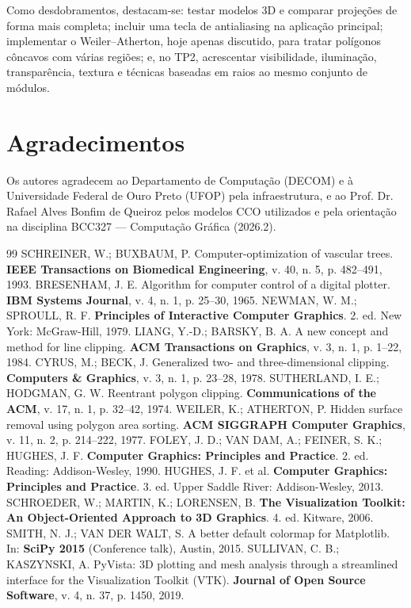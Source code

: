 \documentclass[11pt, a4paper]{article}
\begin{document}
Como desdobramentos, destacam-se: testar modelos 3D e comparar projeções de forma mais completa; incluir uma tecla de antialiasing na aplicação principal; implementar o Weiler--Atherton, hoje apenas discutido, para tratar polígonos côncavos com várias regiões; e, no TP2, acrescentar visibilidade, iluminação, transparência, textura e técnicas baseadas em raios ao mesmo conjunto de módulos.

\section*{Agradecimentos}
Os autores agradecem ao Departamento de Computação (DECOM) e à Universidade Federal de Ouro Preto (UFOP) pela infraestrutura, e ao Prof. Dr. Rafael Alves Bonfim de Queiroz pelos modelos CCO utilizados e pela orientação na disciplina BCC327 --- Computação Gráfica (2026.2).

\begin{thebibliography}{99}
   SCHREINER, W.; BUXBAUM, P. Computer-optimization of vascular trees. \textbf{IEEE Transactions on Biomedical Engineering}, v. 40, n. 5, p. 482--491, 1993.
   BRESENHAM, J. E. Algorithm for computer control of a digital plotter. \textbf{IBM Systems Journal}, v. 4, n. 1, p. 25--30, 1965.
   NEWMAN, W. M.; SPROULL, R. F. \textbf{Principles of Interactive Computer Graphics}. 2. ed. New York: McGraw-Hill, 1979.
   LIANG, Y.-D.; BARSKY, B. A. A new concept and method for line clipping. \textbf{ACM Transactions on Graphics}, v. 3, n. 1, p. 1--22, 1984.
   CYRUS, M.; BECK, J. Generalized two- and three-dimensional clipping. \textbf{Computers \& Graphics}, v. 3, n. 1, p. 23--28, 1978.
   SUTHERLAND, I. E.; HODGMAN, G. W. Reentrant polygon clipping. \textbf{Communications of the ACM}, v. 17, n. 1, p. 32--42, 1974.
   WEILER, K.; ATHERTON, P. Hidden surface removal using polygon area sorting. \textbf{ACM SIGGRAPH Computer Graphics}, v. 11, n. 2, p. 214--222, 1977.
   FOLEY, J. D.; VAN DAM, A.; FEINER, S. K.; HUGHES, J. F. \textbf{Computer Graphics: Principles and Practice}. 2. ed. Reading: Addison-Wesley, 1990.
   HUGHES, J. F. et al. \textbf{Computer Graphics: Principles and Practice}. 3. ed. Upper Saddle River: Addison-Wesley, 2013.
   SCHROEDER, W.; MARTIN, K.; LORENSEN, B. \textbf{The Visualization Toolkit: An Object-Oriented Approach to 3D Graphics}. 4. ed. Kitware, 2006.
   SMITH, N. J.; VAN DER WALT, S. A better default colormap for Matplotlib. In: \textbf{SciPy 2015} (Conference talk), Austin, 2015.
   SULLIVAN, C. B.; KASZYNSKI, A. PyVista: 3D plotting and mesh analysis through a streamlined interface for the Visualization Toolkit (VTK). \textbf{Journal of Open Source Software}, v. 4, n. 37, p. 1450, 2019.
\end{thebibliography}
\end{document}
